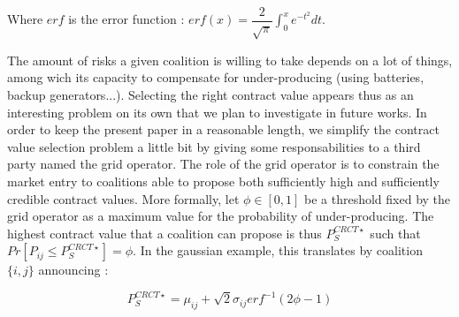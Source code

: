 \documentclass[conference]{IEEEtran}
\begin{document}
Where $ erf $ is the error function : $ erf(x) = \dfrac{2}{\sqrt{\pi}}\int_{0}^{x} e^{-t^{2}} dt $.

The amount of risks a given coalition is willing to take depends on a lot of things, among wich its capacity to compensate for under-producing (using batteries, backup generators...). Selecting the right contract value appears thus as an interesting problem on its own that we plan to investigate in future works. In order to keep the present paper in a reasonable length, we simplify the contract value selection problem a little bit by giving some responsabilities to a third party named the grid operator. The role of the grid operator is to constrain the market entry to coalitions able to propose both sufficiently high and sufficiently credible contract values. More formally, let $ \phi \in [0,1] $ be a threshold fixed by the grid operator as a maximum value for the probability of under-producing. The highest contract value that a coalition can propose is thus $ P_{S}^{CRCT \star} $ such that $ Pr[P_{ij} \leq P_{S}^{CRCT \star}] = \phi $. In the gaussian example, this translates by coalition $ \{i,j\}$ announcing :

\begin{equation}
\label{eq:P_star}
P_{S}^{CRCT \star} = \mu_{ij} + \sqrt{2} \sigma_{ij} erf^{-1}(2 \phi - 1 )
\end{equation}
\end{document}
